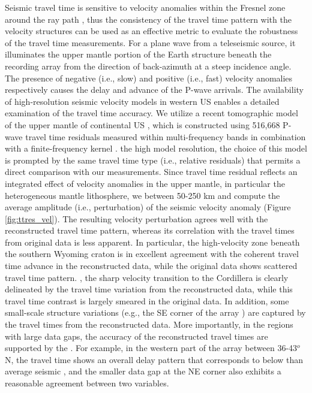 Seismic travel time is sensitive to velocity anomalies within the Fresnel zone around the ray path \cite[]{dahlen2000frechet}, thus the consistency of the travel time pattern with the velocity structures can be used as an effective metric to evaluate the robustness of the travel time measurements. For a plane wave from a teleseismic source, it illuminates the upper mantle portion of the Earth structure beneath the recording array from the direction of back-azimuth  at a steep incidence angle. The presence of negative (i.e., slow) and positive (i.e., fast) velocity anomalies respectively causes the delay and advance of the P-wave arrivals. The availability of high-resolution seismic velocity models in  western US enables a detailed examination of the travel time accuracy. We utilize a recent  tomographic model of the upper mantle of continental US \cite[]{schmandt2014p}, which is constructed using 516,668 P-wave travel time residuals measured within multi-frequency bands in combination with a finite-frequency kernel \cite[]{dahlen2000frechet}.  the high model resolution, the choice of this model is prompted by the same travel time type (i.e., relative residuals) that permits a direct comparison with our measurements. Since travel time residual reflects an integrated effect of velocity anomalies in the upper mantle, in particular the heterogeneous mantle lithosphere, we  between 50-250 km and compute the average amplitude (i.e., perturbation) of the seismic velocity anomaly (Figure \ref{fig:ttres_vel}\color{blue}{(c)}\color{black}{}). The resulting velocity perturbation agrees well with the reconstructed travel time pattern, whereas its correlation with the travel times from original data is less apparent. In particular, the high-velocity zone beneath the southern Wyoming craton is in excellent agreement with the coherent travel time advance in the reconstructed data, while the original data shows  scattered travel time pattern. , the sharp velocity transition to the  Cordillera is clearly delineated by the travel time variation from the reconstructed data, while this travel time contrast is largely smeared in the original data. In addition, some small-scale structure variations (e.g., the SE corner of the array ) are captured by the travel times from the reconstructed data.  More importantly, in the regions with large data gaps, the accuracy of the reconstructed travel times are supported by the .  For example, in the western part of the array between 36-43$^o$  N, the travel time shows an overall delay pattern that corresponds to below than average seismic , and the smaller data gap at the NE corner also exhibits a reasonable agreement between  two variables.

